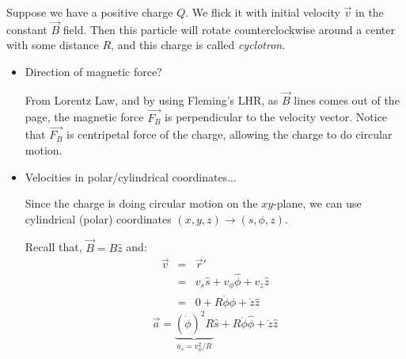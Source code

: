 \documentclass[12pt,a4paper,twoside]{article}
\begin{document}
    \noindent Suppose we have a positive charge $Q$. We flick it with initial velocity $\overrightarrow{v}$ in the constant $\overrightarrow{B}$ field. Then this particle will rotate counterclockwise around a center with some distance $R$, and this charge is called \textit{cyclotron}.
    
    \begin{itemize}
        \item Direction of magnetic force?
        
        From Lorentz Law, and by using Fleming's LHR, as $\overrightarrow{B}$ lines comes out of the page, the magnetic force $\overrightarrow{F_B}$ is perpendicular to the velocity vector. Notice that $\overrightarrow{F_B}$ is centripetal force of the charge, allowing the charge to do circular motion.
        
        \item Velocities in polar/cylindrical coordinates...
        
        Since the charge is doing circular motion on the $xy$-plane, we can use cylindrical (polar) coordinates $(x,y,z)\to(s,\phi, z)$.
        
        Recall that, $\overrightarrow{B}=B\hat{z}$ and:
        \begin{eqnarray*}
            \overrightarrow{v} &=& \overrightarrow{r}'\\
                               &=& v_s\hat{s} + v_\phi\hat{\phi}+v_z\hat{z}\\
                               &=& 0 + R\dot{\phi}\hat{\phi}+\dot{z}\hat{z}
        \end{eqnarray*}
        \begin{equation*}
            \overrightarrow{a} = \underbrace{(\dot{\phi})^2R}_{a_s=v_\phi^2/R}\hat{s}+R\ddot{\phi}\hat{\phi}+\ddot{z}\hat{z}
        \end{equation*}
        

\end{itemize}
\end{document}
